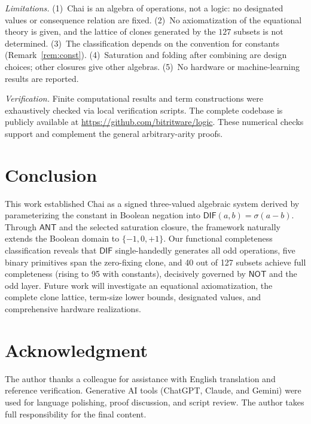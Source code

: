 \documentclass[conference]{IEEEtran}
\newif\ifdraft
\newcommand{\DIF}{\mathsf{DIF}}
\newcommand{\NOT}{\mathsf{NOT}}
\newcommand{\ANT}{\mathsf{ANT}}
\newcommand{\chai}{Chai}
\theoremstyle{remark}
\begin{document}
	\emph{Limitations.} (1)~\chai{} is an algebra of operations, not a logic: no designated values or consequence relation are fixed. (2)~No axiomatization of the equational theory is given, and the lattice of clones generated by the $127$ subsets is not determined. (3)~The classification depends on the convention for constants (Remark~\ref{rem:const}). (4)~Saturation and folding after combining are design choices; other closures give other algebras. (5)~No hardware or machine-learning results are reported.
	
	\emph{Verification.} Finite computational results and term constructions were exhaustively checked via local verification scripts. The complete codebase is publicly available at \url{https://github.com/bitritware/logic}. These numerical checks support and complement the general arbitrary-arity proofs.
	
	\section{Conclusion}
	This work established Chai as a signed three-valued algebraic system derived by parameterizing the constant in Boolean negation into $\DIF(a,b) = \sigma(a-b)$. Through $\ANT$ and the selected saturation closure, the framework naturally extends the Boolean domain to $\{-1,0,+1\}$. Our functional completeness classification reveals that $\DIF$ single-handedly generates all odd operations, five binary primitives span the zero-fixing clone, and 40 out of 127 subsets achieve full completeness (rising to 95 with constants), decisively governed by $\NOT$ and the odd layer. Future work will investigate an equational axiomatization, the complete clone lattice, term-size lower bounds, designated values, and comprehensive hardware realizations.
	
	
	\section*{Acknowledgment}
	The author thanks \ifdraft Megan, \fi a colleague for assistance with English translation and reference verification. Generative AI tools (ChatGPT, Claude, and Gemini) were used for language polishing, proof discussion, and script review. The author takes full responsibility for the final content.
	\balance
	
\end{document}

